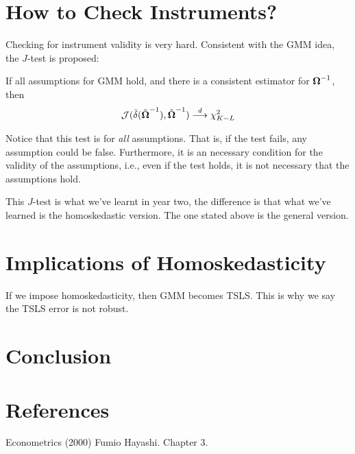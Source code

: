 \documentclass{article}
\begin{document}

\section{How to Check Instruments?}

Checking for instrument validity is very hard.
Consistent with the GMM idea, the $J$-test is proposed:

\begin{proposition}
	If all assumptions for GMM hold,
	and there is a consistent estimator for $\boldsymbol{\Omega}^{-1}$,
	then
	\begin{align*}
		\mathcal{J}(\hat{\delta}(\hat{\boldsymbol{\Omega}}^{-1}),\hat{\boldsymbol{\Omega}}^{-1})\overset{d}{\longrightarrow} \chi^2_{K-L}
	\end{align*}
\end{proposition}
\begin{remark}
	Notice that this test is for \emph{all} assumptions.
	That is, if the test fails, any assumption could be false.
	Furthermore, it is an necessary condition for the validity of the assumptions,
	i.e., even if the test holds, it is not necessary that the assumptions hold.
\end{remark}

This $J$-test is what we've learnt in year two,
the difference is that what we've learned is the homoskedastic version.
The one stated above is the general version.

\section{Implications of Homoskedasticity}

If we impose homoskedasticity, then GMM becomes TSLS.
This is why we say the TSLS error is not robust.

\section{Conclusion}

\vfill
\section*{References}
\begin{enumerate}[label = {[\arabic*]}]
	\item Econometrics (2000) Fumio Hayashi. Chapter 3. \asDemonstrated %
\end{enumerate}
\end{document}
